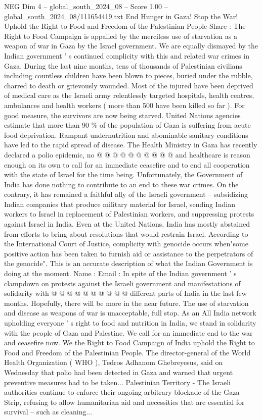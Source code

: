 \begin{textsample}{NEG Dim 4 – global\_south\_2024\_08 – Score 1.00 – global\_south\_2024\_08/111654419.txt}  \label{ex:f4_neg_337}
End Hunger in Gaza!
Stop the War!
Uphold the Right to Food and Freedom of the Palestinian People Share : The Right to Food Campaign is appalled by the merciless use of starvation as a weapon of war in Gaza by the Israel government.
We are equally dismayed by the Indian government ' s continued complicity with this and related war crimes in Gaza.
During the last nine months, tens of thousands of Palestinian civilians including countless children have been blown to pieces, buried under the rubble, charred to death or grievously wounded.
Most of the injured have been deprived of medical care as the Israeli army relentlessly targeted hospitals, health centres, ambulances and health workers ( more than 500 have been killed so far ).
For good measure, the survivors are now being starved.
United Nations agencies estimate that more than 90 \% of the population of Gaza is suffering from acute food deprivation.
Rampant undernutrition and abominable sanitary conditions have led to the rapid spread of disease.
The Health Ministry in Gaza has recently declared a polio epidemic, no @ @ @ @ @ @ @ @ @ @ and healthcare is reason enough on its own to call for an immediate ceasefire and to end all cooperation with the state of Israel for the time being.
Unfortunately, the Government of India has done nothing to contribute to an end to these war crimes.
On the contrary, it has remained a faithful ally of the Israeli government -- subsidizing Indian companies that produce military material for Israel, sending Indian workers to Israel in replacement of Palestinian workers, and suppressing protests against Israel in India.
Even at the United Nations, India has mostly abstained from efforts to bring about resolutions that would restrain Israel.
According to the International Court of Justice, complicity with genocide occurs when"some positive action has been taken to furnish aid or assistance to the perpetrators of the genocide".
This is an accurate description of what the Indian Government is doing at the moment.
Name : Email : In spite of the Indian government ' s clampdown on protests against the Israeli government and manifestations of solidarity with @ @ @ @ @ @ @ @ @ @ different parts of India in the last few months.
Hopefully, there will be more in the near future.
The use of starvation and disease as weapons of war is unacceptable, full stop.
As an All India network upholding everyone ' s right to food and nutrition in India, we stand in solidarity with the people of Gaza and Palestine.
We call for an immediate end to the war and ceasefire now.
We the Right to Food Campaign of India uphold the Right to Food and Freedom of the Palestinian People.
The director-general of the World Health Organization ( WHO ), Tedros Adhanom Ghebreyesus, said on Wednesday that polio had been detected in Gaza and warned that urgent preventive measures had to be taken...
Palestinian Territory - The Israeli authorities continue to enforce their ongoing arbitrary blockade of the Gaza Strip, refusing to allow humanitarian aid and necessities that are essential for survival -- such as cleaning...

\end{textsample}
